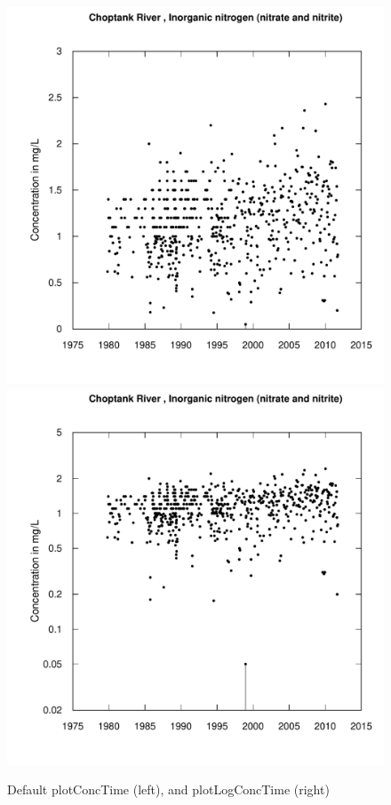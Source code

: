 \documentclass[a4paper,11pt]{article}\usepackage{graphicx, color}
\newenvironment{knitrout}{}{} %
\begin{document}
\begin{knitrout}
\color{fgcolor}\begin{figure}[]

\includegraphics[width=.5\linewidth,height=.5\linewidth]{figure/plotConcTime1} 
\includegraphics[width=.5\linewidth,height=.5\linewidth]{figure/plotConcTime2} \caption[Default plotConcTime (left), and plotLogConcTime (right)]{Default plotConcTime (left), and plotLogConcTime (right)\label{fig:plotConcTime}}
\end{figure}


\end{knitrout}
\end{document}
